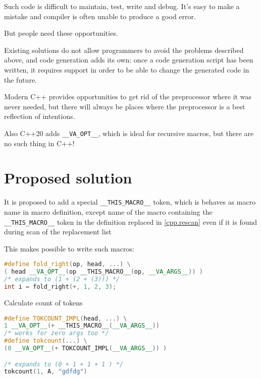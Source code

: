 \documentclass[12pt]{article}
\begin{document}
Such code is difficult to maintain, test, write and debug.
It's easy to make a mistake and compiler is often unable to produce a good error.

\medskip

But people need these opportunities.

\bigskip


Existing solutions do not allow programmers to avoid the problems described above,
and code generation adds its own: once a code generation script has been written,
it requires support in order to be able to change the generated code in the future.

\bigskip

Modern C++ provides opportunities to get rid of the preprocessor where it was never needed,
but there will always be places where the preprocessor is a best reflection of intentions.

\bigskip

Also C++20 adds \lstinline{__VA_OPT__}, which is ideal for recursive macros, but there are no such thing in C++!

\newpage

\section{Proposed solution}

It is proposed to add a special \lstinline{__THIS_MACRO__} token, which is behaves as macro name in macro definition,
except name of the macro containing the \lstinline{__THIS_MACRO__} token in the definition replaced in 
\href{https://eel.is/c++draft/cpp.rescan}{[cpp.rescan]} even if it is found during scan of the replacement list

\medskip

This makes possible to write such macros:

\begin{lstlisting}[language=C++]
#define fold_right(op, head, ...) \
( head __VA_OPT__(op __THIS_MACRO__(op, __VA_ARGS__)) )
/* expands to (1 + (2 + (3))) */
int i = fold_right(+, 1, 2, 3);
\end{lstlisting}

Calculate count of tokens
\begin{lstlisting}[language=C++]
#define TOKCOUNT_IMPL(head, ...) \
1 __VA_OPT__(+ __THIS_MACRO__(__VA_ARGS__))
/* works for zero args too */
#define tokcount(...) \
(0 __VA_OPT__(+ TOKCOUNT_IMPL(__VA_ARGS__)) )

/* expands to (0 + 1 + 1 + 1 ) */
tokcount(1, A, "gdfdg")

\end{lstlisting}
\end{document}
